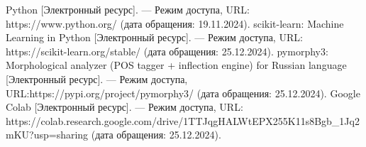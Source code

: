 \begin{thebibliography}{}
	 Python [Электронный ресурс]. — Режим доступа, URL: https://www.python.org/ (дата обращения: 19.11.2024).
	 scikit-learn: Machine Learning in Python [Электронный ресурс]. — Режим доступа, URL: https://scikit-learn.org/stable/ (дата обращения: 25.12.2024).
	 pymorphy3: Morphological analyzer (POS tagger + inflection engine) for Russian language [Электронный ресурс]. — Режим доступа, URL:https://pypi.org/project/pymorphy3/ (дата обращения: 25.12.2024).
	 Google Colab [Электронный ресурс]. — Режим доступа, URL: https://colab.research.google.com/drive/1TTJqgHALWtEPX255K11s8Bgb\_1Jq2mKU?usp=sharing (дата обращения: 25.12.2024).
\end{thebibliography}
